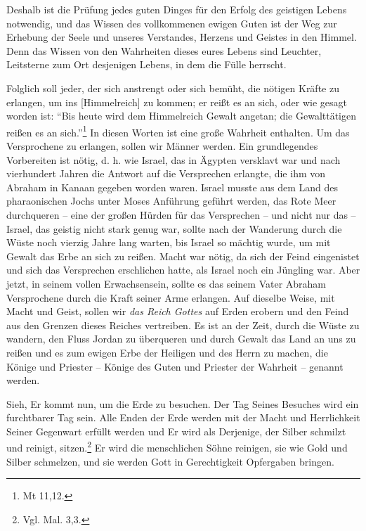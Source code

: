         Deshalb ist die Prüfung jedes guten Dinges für den Erfolg des geistigen Lebens notwendig, und das Wissen des vollkommenen ewigen Guten ist der Weg zur Erhebung der Seele und unseres Verstandes, Herzens und Geistes in den Himmel. Denn das Wissen von den Wahrheiten dieses eures Lebens sind Leuchter, Leitsterne zum Ort desjenigen Lebens, in dem die Fülle herrscht. 
        
        Folglich soll jeder, der sich anstrengt oder sich bemüht, die nötigen Kräfte zu erlangen, um ins [Himmelreich] zu kommen; er reißt es an sich, oder wie gesagt worden ist: "`Bis heute wird dem Himmelreich Gewalt angetan; die Gewalttätigen reißen es an sich."'\footnote{Mt 11,12.} In diesen Worten ist eine große Wahrheit enthalten. Um das Versprochene zu erlangen, sollen wir Männer werden. Ein grundlegendes Vorbereiten ist nötig, d. h. wie Israel, das in Ägypten versklavt war und nach vierhundert Jahren die Antwort auf die Versprechen erlangte, die ihm von Abraham in Kanaan gegeben worden waren. Israel musste aus dem Land des pharaonischen Jochs unter Moses Anführung geführt werden, das Rote Meer durchqueren -- eine der großen Hürden für das Versprechen -- und nicht nur das -- Israel, das geistig nicht stark genug war, sollte nach der Wanderung durch die Wüste noch vierzig Jahre lang warten, bis Israel so mächtig wurde, um mit Gewalt das Erbe an sich zu reißen. Macht war nötig, da sich der Feind eingenistet und sich das Versprechen erschlichen hatte, als Israel noch ein Jüngling war. Aber jetzt, in seinem vollen Erwachsensein, sollte es das seinem Vater Abraham Versprochene durch die Kraft seiner Arme erlangen. Auf dieselbe Weise, mit Macht und Geist, sollen wir \textit{das Reich Gottes} auf Erden erobern und den Feind aus den Grenzen dieses Reiches vertreiben. Es ist an der Zeit, durch die Wüste zu wandern, den Fluss Jordan zu überqueren und durch Gewalt das Land an uns zu reißen und es zum ewigen Erbe der Heiligen und des Herrn zu machen, die Könige und Priester -- Könige des Guten und Priester der Wahrheit -- genannt werden. 
        
        Sieh, Er kommt nun, um die Erde zu besuchen. Der Tag Seines Besuches wird ein furchtbarer Tag sein. Alle Enden der Erde werden mit der Macht und Herrlichkeit Seiner Gegenwart erfüllt werden und Er wird als Derjenige, der Silber schmilzt und reinigt, sitzen.\footnote{Vgl. Mal. 3,3.} Er wird die menschlichen Söhne reinigen, sie wie Gold und Silber schmelzen, und sie werden Gott in Gerechtigkeit Opfergaben bringen. 
        
